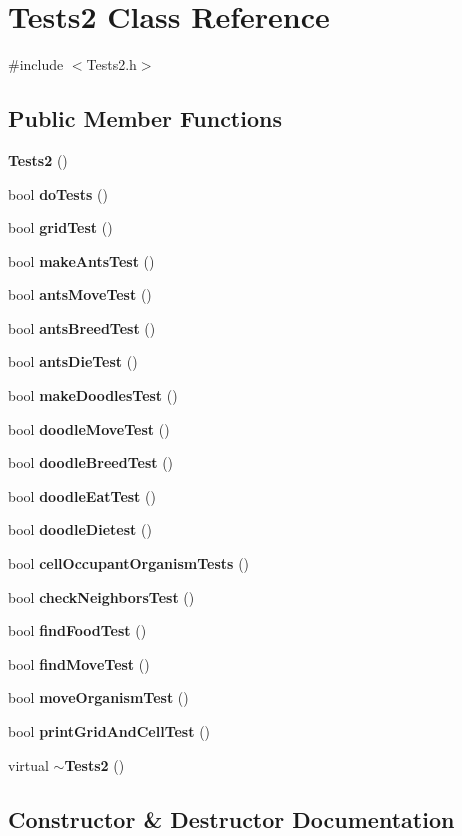 \section{Tests2 Class Reference}
\label{classTests2}


{\ttfamily \#include $<$Tests2.\+h$>$}

\subsection*{Public Member Functions}
\begin{DoxyCompactItemize}
\item 
\textbf{ Tests2} ()
\item 
bool \textbf{ do\+Tests} ()
\item 
bool \textbf{ grid\+Test} ()
\item 
bool \textbf{ make\+Ants\+Test} ()
\item 
bool \textbf{ ants\+Move\+Test} ()
\item 
bool \textbf{ ants\+Breed\+Test} ()
\item 
bool \textbf{ ants\+Die\+Test} ()
\item 
bool \textbf{ make\+Doodles\+Test} ()
\item 
bool \textbf{ doodle\+Move\+Test} ()
\item 
bool \textbf{ doodle\+Breed\+Test} ()
\item 
bool \textbf{ doodle\+Eat\+Test} ()
\item 
bool \textbf{ doodle\+Dietest} ()
\item 
bool \textbf{ cell\+Occupant\+Organism\+Tests} ()
\item 
bool \textbf{ check\+Neighbors\+Test} ()
\item 
bool \textbf{ find\+Food\+Test} ()
\item 
bool \textbf{ find\+Move\+Test} ()
\item 
bool \textbf{ move\+Organism\+Test} ()
\item 
bool \textbf{ print\+Grid\+And\+Cell\+Test} ()
\item 
virtual \textbf{ $\sim$\+Tests2} ()
\end{DoxyCompactItemize}


\subsection{Constructor \& Destructor Documentation}
\mbox{\label{classTests2_a6d7d8d248dd3d544199769baa1face60}} 

